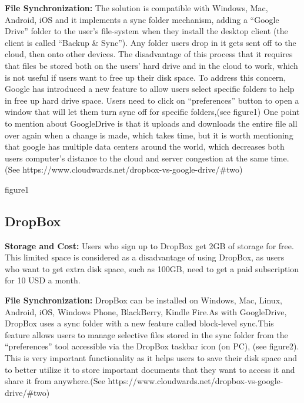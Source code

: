 \documentclass{article}
\begin{document}
\newline
\hfill \break %
\textbf{File Synchronization:}
The solution is compatible with Windows, Mac, Android, iOS and it implements a sync folder mechanism, adding a “Google Drive” folder to the user's file-system when they install the desktop client (the client is called “Backup & Sync”). Any folder users drop in it gets sent off to the cloud, then onto other devices. The disadvantage of this process that it requires that files be stored both on the users’ hard drive and in the cloud to work, which is not useful if users want to free up their disk space. To address this concern, Google has introduced a new feature to allow users select specific folders to help in free up hard drive space. Users need to click on “preferences” button to open a window that will let them turn sync off for specific folders,(see figure1)
One point to mention about GoogleDrive is that it uploads and downloads the entire file all over again when a change is made, which takes time, but it is worth mentioning that google has multiple data centers around the world, which decreases both users computer’s distance to the cloud and server congestion at the same time. (See https://www.cloudwards.net/dropbox-vs-google-drive/#two)

figure1

\subsection{DropBox}
\textbf{Storage and Cost:}
Users who sign up to DropBox get 2GB of storage for free. This limited space is considered as a disadvantage of using DropBox, as users who want to get extra disk space, such as 100GB, need to get a paid subscription for 10 USD a month.

\newline
\hfill \break
\textbf{File Synchronization:}
DropBox can be installed on Windows, Mac, Linux, Android, iOS, Windows Phone, BlackBerry, Kindle Fire.As with GoogleDrive, DropBox uses a sync folder with a new feature called block-level sync.This feature allows users to manage selective files stored in the sync folder from the “preferences” tool accessible via the DropBox taskbar icon (on PC), (see figure2). This is very important functionality as it helps users to save their disk space and to better utilize it to store important documents that they want to access it and share it from anywhere.(See https://www.cloudwards.net/dropbox-vs-google-drive/#two)

\newline
\hfill \break
\end{document}

